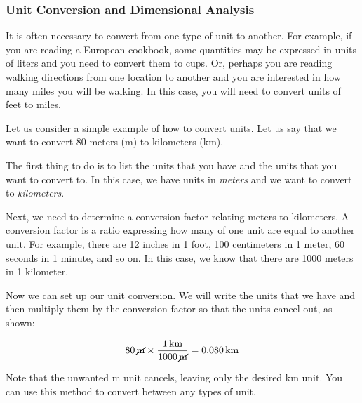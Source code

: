 \documentclass[main-ap-physics.tex]{subfiles}
\begin{document}
\subsubsection*{Unit Conversion and Dimensional Analysis}

It is often necessary to convert from one type of unit to another. For example, if you are reading a European cookbook, some quantities may be expressed in units of liters and you need to convert them to cups. Or, perhaps you are reading walking directions from one location to another and you are interested in how many miles you will be walking. In this case, you will need to convert units of feet to miles.

\vspace{1em}

Let us consider a simple example of how to convert units. Let us say that we want to convert 80 meters (m) to kilometers (km).

\vspace{1em}

The first thing to do is to list the units that you have and the units that you want to convert to. In this case, we have units in \textit{meters} and we want to convert to \textit{kilometers}.

\vspace{1em}

Next, we need to determine a \gls{conversion factor} relating meters to kilometers. A conversion factor is a ratio expressing how many of one unit are equal to another unit. For example, there are 12 inches in 1 foot, 100 centimeters in 1 meter, 60 seconds in 1 minute, and so on. In this case, we know that there are \num{1000} meters in 1 kilometer.

\vspace{1em}

Now we can set up our unit conversion. We will write the units that we have and then multiply them by the conversion factor so that the units cancel out, as shown:

\begin{equation}
    \SI{80}{\cancel\meter} \times \frac{\SI{1}{km}}{\SI{1000}{\cancel\meter}} = \SI{0.080}{km}
\end{equation}

Note that the unwanted m unit cancels, leaving only the desired km unit. You can use this method to convert between any types of unit.

\end{document}
